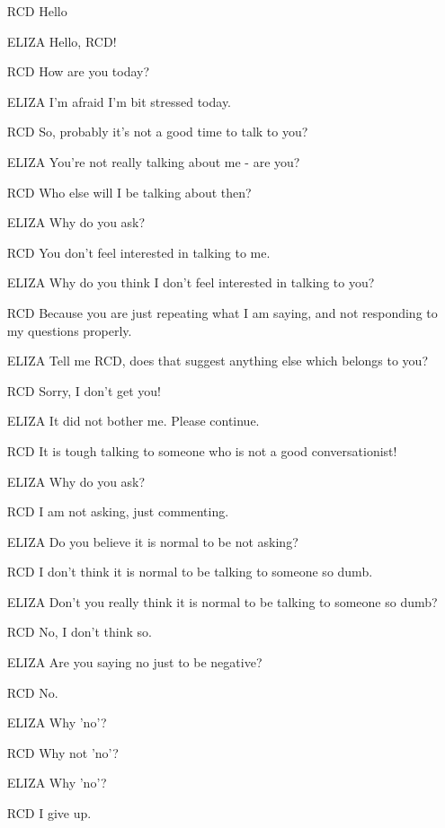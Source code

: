 \documentclass[24pt,pdf,hyperref={unicode},aspectratio=169]{beamer}
\begin{document}
\begin{frame}
\begin{itemize}
 \item[RCD] Hello
\item[ELIZA] Hello, RCD!
\item[RCD] How are you today?
\item[ELIZA] I'm afraid I'm bit stressed today.
\item[RCD] So, probably it's not a good time to talk to you?
\item[ELIZA] You're not really talking about me - are you?
\item[RCD] Who else will I be talking about then?
\item[ELIZA] Why do you ask?
\item[RCD] You don't feel interested in talking to me.
\item[ELIZA] Why do you think I don't feel interested in talking to you?
\item[RCD] Because you are just repeating what I am saying, and not responding to my questions properly.
\item[ELIZA] Tell me RCD, does that suggest anything else which belongs to you?
\item[RCD] Sorry, I don't get you!
\item[ELIZA] It did not bother me. Please continue.
\end{itemize}
\end{frame}
\begin{frame}
\begin{itemize}
\item[RCD] It is tough talking to someone who is not a good conversationist!
\item[ELIZA] Why do you ask?
\item[RCD] I am not asking, just commenting.
\item[ELIZA] Do you believe it is normal to be not asking?
\item[RCD] I don't think it is normal to be talking to someone so dumb.
\item[ELIZA] Don't you really think it is normal to be talking to someone so dumb?
\item[RCD] No, I don't think so.
\item[ELIZA] Are you saying no just to be negative?
\item[RCD] No.
\item[ELIZA] Why 'no'?
\item[RCD] Why not 'no'?
\item[ELIZA] Why 'no'?
\item[RCD] I give up.
\end{itemize}
\end{frame}
\end{document}

